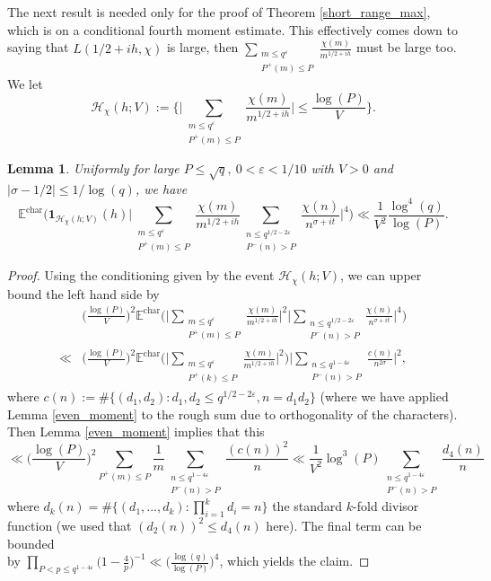 \documentclass[10pt,a4paper]{amsart}
\newtheorem{lemma}{Lemma}
\numberwithin{equation}{section}
\begin{document}
The next result is needed only for the proof of Theorem \ref{short_range_max}, which is on a conditional fourth moment estimate. This effectively comes down to saying that $L(1/2+ih,\chi)$ is large, then $\sum_{\substack{m \leq q^\varepsilon \\ P^+(m) \leq P}}\frac{\chi(m)}{m^{1/2+ih}}$ must be large too. We let
$$\mathcal{H}_\chi(h;V) := \big\{\big|\sum_{\substack{m \leq q^\varepsilon \\ P^+(m) \leq P}}\frac{\chi(m)}{m^{1/2+ih}}\big| \leq \frac{\log(P)}{V}\big\}.$$
\begin{lemma}
    Uniformly for large $ P \leq \sqrt{q}, \ 0 <\varepsilon < 1/10$ with $V>0$ and $|\sigma-1/2| \leq 1/\log(q)$, we have
    $$\mathbb{E}^{\text{char}}\big(\mathbf{1}_{\mathcal{H}_\chi(h;V)}(h)\big|\sum_{\substack{m \leq q^\varepsilon \\ P^+(m) \leq P}}\frac{\chi(m)}{m^{1/2+ih}}\sum_{\substack{n \leq q^{1/2-2\varepsilon} \\ P^{-}(n) > P}}\frac{\chi(n)}{n^{\sigma+it}}\big|^4\big) \ll \frac{1}{V^2}\frac{\log^4(q)}{\log(P)}.$$ \label{conditional_fourth}
\end{lemma}
\begin{proof}
    Using the conditioning given by the event $\mathcal{H}_\chi(h;V)$, we can upper bound the left hand side by
    \begin{align*}
        &\big(\frac{\log(P)}{V}\big)^2\mathbb{E}^{\text{char}}\big(\big|\sum_{\substack{m \leq q^\varepsilon \\ P^+(m) \leq P}}\frac{\chi(m)}{m^{1/2+ih}}\big|^2\big|\sum_{\substack{n \leq q^{1/2-2\varepsilon} \\ P^{-}(n) > P}}\frac{\chi(n)}{n^{\sigma+it}}\big|^4\big) \\
        \ll& \big(\frac{\log(P)}{V}\big)^2\mathbb{E}^{\text{char}}\big(\big|\sum_{\substack{m \leq q^\varepsilon \\ P^+(k) \leq P}}\frac{\chi(m)}{m^{1/2+ih}}\big|^2\big)\big|\sum_{\substack{n \leq q^{1-4\varepsilon} \\ P^{-}(n) > P}}\frac{c(n)}{n^{2\sigma}}\big|^2,
    \end{align*}
    where $c(n) := \#\{(d_1,d_2): d_1,d_2 \leq q^{1/2-2\varepsilon},  n=d_1d_2\}$ (where we have applied Lemma \ref{even_moment} to the rough sum due to orthogonality of the characters). Then Lemma \ref{even_moment} implies that this
    $$\ll \big(\frac{\log(P)}{V}\big)^2\sum_{P^+(m) \leq P}\frac{1}{m}\sum_{\substack{n \leq q^{1-4\varepsilon} \\ P^-(n) > P}}\frac{(c(n))^2}{n} \ll \frac{1}{V^2}\log^3(P)\sum_{\substack{n \leq q^{1-4\varepsilon} \\ P^-(n) > P}}\frac{d_4(n)}{n}$$
    where $d_k(n) = \#\{(d_1,...,d_k):\prod_{i=1}^kd_i=n\}$ the standard $k$-fold divisor function (we used that $(d_2(n))^2 \leq d_4(n)$ here). The final term can be bounded \\ by $\prod_{P < p \leq q^{1-4\varepsilon}}\big(1-\frac{4}{p}\big)^{-1} \ll \big(\frac{\log(q)}{\log(P)}\big)^4$, which yields the claim.  
\end{proof}
\end{document}
